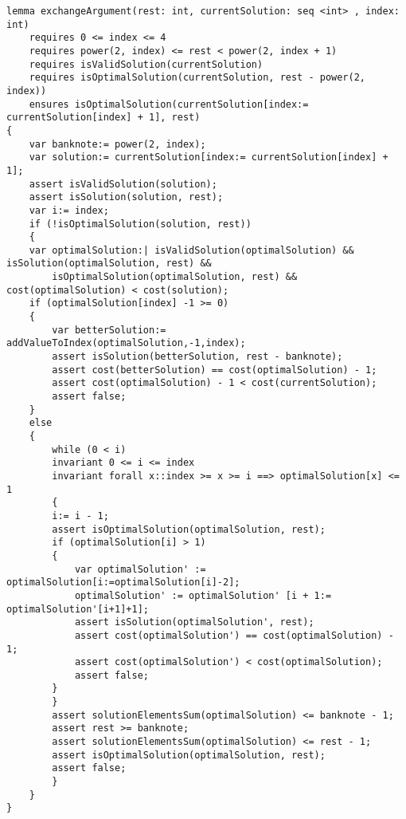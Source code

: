     
    \begin{lstlisting}
lemma exchangeArgument(rest: int, currentSolution: seq <int> , index: int)
    requires 0 <= index <= 4
    requires power(2, index) <= rest < power(2, index + 1)
    requires isValidSolution(currentSolution)
    requires isOptimalSolution(currentSolution, rest - power(2, index))
    ensures isOptimalSolution(currentSolution[index:= currentSolution[index] + 1], rest) 
{
    var banknote:= power(2, index);
    var solution:= currentSolution[index:= currentSolution[index] + 1];
    assert isValidSolution(solution);
    assert isSolution(solution, rest);
    var i:= index;
    if (!isOptimalSolution(solution, rest)) 
    {
    var optimalSolution:| isValidSolution(optimalSolution) && isSolution(optimalSolution, rest) &&
        isOptimalSolution(optimalSolution, rest) && cost(optimalSolution) < cost(solution);
    if (optimalSolution[index] -1 >= 0) 
    {
        var betterSolution:= addValueToIndex(optimalSolution,-1,index);
        assert isSolution(betterSolution, rest - banknote);
        assert cost(betterSolution) == cost(optimalSolution) - 1;
        assert cost(optimalSolution) - 1 < cost(currentSolution);
        assert false;
    } 
    else 
    {
        while (0 < i)
        invariant 0 <= i <= index
        invariant forall x::index >= x >= i ==> optimalSolution[x] <= 1 
        {
        i:= i - 1;
        assert isOptimalSolution(optimalSolution, rest);
        if (optimalSolution[i] > 1) 
        {
            var optimalSolution' := optimalSolution[i:=optimalSolution[i]-2];
            optimalSolution' := optimalSolution' [i + 1:= optimalSolution'[i+1]+1];
            assert isSolution(optimalSolution', rest);
            assert cost(optimalSolution') == cost(optimalSolution) - 1;
            assert cost(optimalSolution') < cost(optimalSolution);
            assert false;
        }
        }
        assert solutionElementsSum(optimalSolution) <= banknote - 1;
        assert rest >= banknote; 
        assert solutionElementsSum(optimalSolution) <= rest - 1; 
        assert isOptimalSolution(optimalSolution, rest); 
        assert false;
        }
    }
}
    \end{lstlisting}
    
